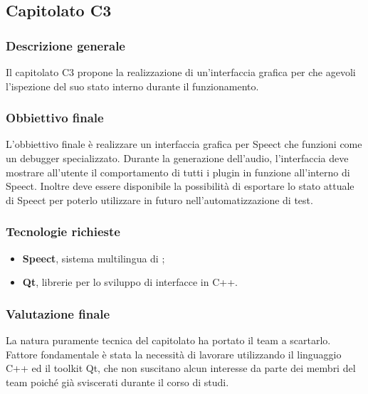 \subsection{Capitolato C3}

\subsubsection{Descrizione generale}
Il capitolato C3 propone la realizzazione di un'interfaccia grafica per  che agevoli l'ispezione del suo stato interno durante il funzionamento.

\subsubsection{Obbiettivo finale}
L'obbiettivo finale è realizzare un interfaccia grafica per Speect che funzioni come un debugger specializzato. 
Durante la generazione dell'audio, l'interfaccia deve mostrare all'utente il comportamento di tutti i plugin in funzione all'interno di Speect.
Inoltre deve essere disponibile la possibilità di esportare lo stato attuale di Speect per poterlo utilizzare in futuro nell'automatizzazione di test.

\subsubsection{Tecnologie richieste}
\begin{itemize}
\item \textbf{Speect}, sistema multilingua di ;
\item \textbf{Qt}, librerie per lo sviluppo di interfacce in C++.
\end{itemize}

\subsubsection{Valutazione finale}
La natura puramente tecnica del capitolato ha portato il team a scartarlo. 
Fattore fondamentale è stata la necessità di lavorare utilizzando il linguaggio C++ ed il toolkit Qt, 
che non suscitano alcun interesse da parte dei membri del team poiché già sviscerati durante il corso di studi.
